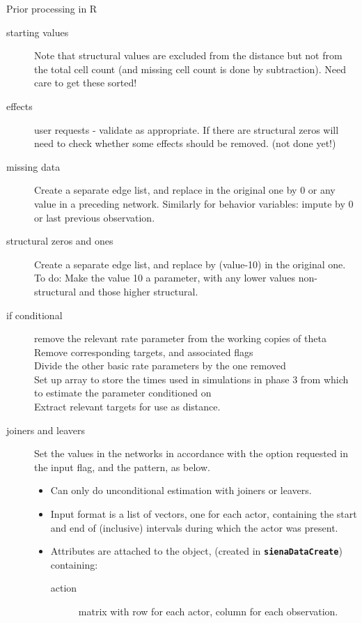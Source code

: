 \documentclass[12pt,a4paper]{article}
\makeatletter
\renewcommand{\=}{\,=\,}
\newcommand{\+}{\,+\,}
\newcommand{\sfn}[1]{\textbf{\texttt{#1}}}
\renewcommand{\section}{\@startsection{section}{1}
                {0pt}{\baselineskip}{0.5\baselineskip}
                {\centering\sffamily} }
\makeatother
\begin{document}
\section{Prior processing in R}
\begin{description}
\item[starting values] Note that structural values are excluded from the
  distance but not from the total cell count (and missing cell count is done by
  subtraction). Need care to get these sorted!
\item[effects] user requests - validate as appropriate. If there are
  structural zeros will need to check whether some effects should be
  removed. (not done yet!)
\item[missing data] Create a separate edge list, and replace in the original one
  by 0 or any value in a preceding network. Similarly for
    behavior variables: impute by 0 or last previous observation.
\item[structural zeros and ones] Create a separate edge list, and replace by
  (value-10) in the original one. To do: Make the value 10 a parameter,
    with any lower values non-structural and those higher structural.
\item[if conditional]
remove the relevant rate parameter from the working copies of
theta\\
Remove corresponding targets, and associated flags\\
Divide the other basic rate parameters by the one removed\\
Set up array to store the times used in simulations in phase 3 from
which to estimate the parameter conditioned on\\
Extract relevant targets for use as distance.
\item[joiners and leavers] Set the values in the networks in
  accordance with the option requested in the input flag, and the
  pattern, as below.
\begin{itemize}
\item Can only do unconditional estimation with joiners or leavers.
\item Input format is a list of vectors, one for each actor,
containing the start and end of (inclusive) intervals during which the actor was
present.
\item Attributes are attached to the object, (created in \sfn{sienaDataCreate})
  containing:
\begin{description}
\item[action] matrix with row for each actor, column for each observation.

\end{description}
\end{itemize}
\end{description}
\end{document}
